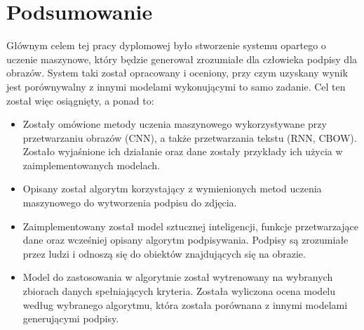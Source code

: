 \newpage


\newpage

\section*{Podsumowanie}
Głównym celem tej pracy dyplomowej było stworzenie systemu opartego o uczenie maszynowe, który będzie generował zrozumiałe dla człowieka podpisy dla obrazów. System taki został opracowany i oceniony, przy czym uzyskany wynik jest porównywalny z innymi modelami wykonującymi to samo zadanie. Cel ten został więc osiągnięty, a ponad to:
\begin{itemize}
	\item	Zostały omówione metody uczenia maszynowego wykorzystywane przy przetwarzaniu obrazów (CNN), a także przetwarzania tekstu (RNN, CBOW). Zostało wyjaśnione ich działanie oraz dane zostały przykłady ich użycia w zaimplementowanych modelach.
    \item	Opisany został algorytm korzystający z wymienionych metod uczenia maszynowego do wytworzenia podpisu do zdjęcia.
    \item	Zaimplementowany został model sztucznej inteligencji, funkcje przetwarzające dane oraz wcześniej opisany algorytm podpisywania. Podpisy są zrozumiałe przez ludzi i odnoszą się do obiektów znajdujących się na obrazie.
    \item	Model do zastosowania w algorytmie został wytrenowany na wybranych zbiorach danych spełniających kryteria. Została wyliczona ocena modelu według wybranego algorytmu, która została porównana z innymi modelami generującymi podpisy.
\end{itemize}

